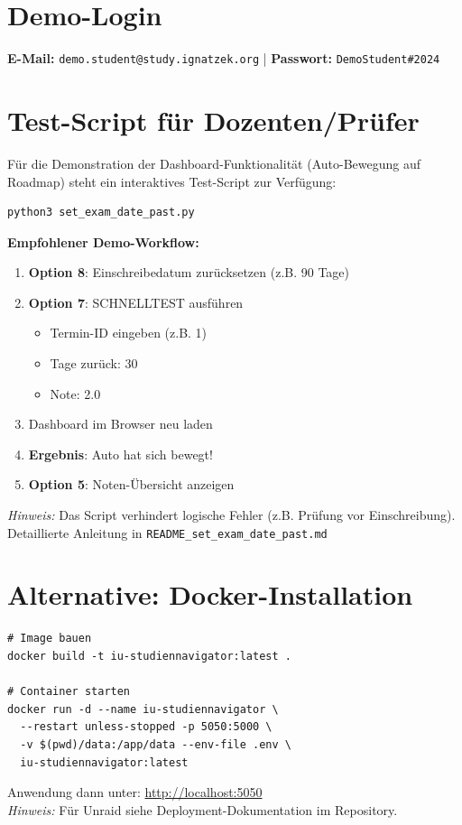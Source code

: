 \documentclass[11pt,a4paper]{article}
\begin{document}
\section*{Demo-Login}
\textbf{E-Mail:} \texttt{demo.student@study.ignatzek.org} | \textbf{Passwort:} \texttt{DemoStudent\#2024}

\section*{Test-Script für Dozenten/Prüfer}
Für die Demonstration der Dashboard-Funktionalität (Auto-Bewegung auf Roadmap) steht ein interaktives Test-Script zur Verfügung:

\begin{verbatim}
python3 set_exam_date_past.py
\end{verbatim}

\textbf{Empfohlener Demo-Workflow:}
\begin{enumerate}[itemsep=2pt]
    \item \textbf{Option 8}: Einschreibedatum zurücksetzen (z.B. 90 Tage)
    \item \textbf{Option 7}: SCHNELLTEST ausführen
    \begin{itemize}[itemsep=0pt]
        \item Termin-ID eingeben (z.B. 1)
        \item Tage zurück: 30
        \item Note: 2.0
    \end{itemize}
    \item Dashboard im Browser neu laden
    \item \textbf{Ergebnis}: Auto hat sich bewegt! 🚗
    \item \textbf{Option 5}: Noten-Übersicht anzeigen
\end{enumerate}

\textit{Hinweis:} Das Script verhindert logische Fehler (z.B. Prüfung vor Einschreibung). Detaillierte Anleitung in \texttt{README\_set\_exam\_date\_past.md}

\section*{Alternative: Docker-Installation}
\begin{verbatim}
# Image bauen
docker build -t iu-studiennavigator:latest .

# Container starten
docker run -d --name iu-studiennavigator \
  --restart unless-stopped -p 5050:5000 \
  -v $(pwd)/data:/app/data --env-file .env \
  iu-studiennavigator:latest
\end{verbatim}
Anwendung dann unter: \url{http://localhost:5050}\\
\textit{Hinweis:} Für Unraid siehe Deployment-Dokumentation im Repository.
\end{document}
